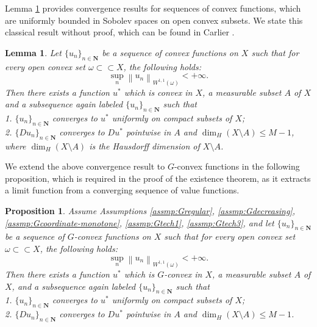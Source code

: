 \documentclass[a4paper, 11pt]{amsart}
\numberwithin{equation}{section}
\theoremstyle{plain}
\newtheorem{lemma}[theorem]{Lemma}
\newtheorem{proposition}[theorem]{Proposition}
\theoremstyle{definition}
\theoremstyle{remark}
\newcommand{\N}{\mathbf{N}}
\newcommand{\norm}[1]{\left\lVert#1\right\rVert}
\begin{document}
Lemma \ref{lemma1} provides convergence results for sequences of convex functions, which are uniformly bounded in Sobolev spaces on open convex subsets. We state this classical result without proof, which can be found in Carlier \cite{Carlier01}.\medskip


\begin{lemma}\label{lemma1}
	Let $\{u_n\}_{n\in \N}$ be a sequence of convex functions on $X$ such that for every open convex set $\omega \subset \subset X$, the following holds:
	\begin{equation*}
	\sup\limits_{n} \norm{u_n}_{W^{1,1}(\omega)} < +\infty.
	\end{equation*}
	Then there exists a function $u^*$ %
	which is convex in $X$, a measurable subset $A$ of $X$ and a subsequence again labeled $\{u_n\}_{n\in \N}$ such that\\
	1. $\{u_n\}_{n\in \N}$ converges to $u^*$ uniformly on compact subsets of $X$;\\
	2. $\{D u_n\}_{n\in \N}$ converges to $D u^*$ pointwise in $A$ and $\dim_{H}(X\setminus A)\le M-1$, where $\dim_{H}(X\setminus A)$ is the Hausdorff dimension of $X\setminus A$.
\end{lemma}

{We extend the above convergence result to $G$-convex functions in the following proposition, which is required in the proof of the existence theorem, as it extracts a limit function from a converging sequence of value functions.}

\begin{proposition}\label{proposition:convergence}
	Assume Assumptions \ref{assmp:Gregular}, \ref{assmp:Gdecreasing}, \ref{assmp:Gcoordinate-monotone}, \ref{assmp:Gtech1}, \ref{assmp:Gtech3}, and let $\{u_n\}_{n\in \N}$ be a sequence of $G$-convex functions on $X$ such that for every open convex set $\omega \subset \subset X$, the following holds:
	\begin{equation*}
	\sup\limits_{n} \norm{u_n}_{W^{1,1}(\omega )} < +\infty.
	\end{equation*}
	Then there exists a function $u^*$ which is  $G$-convex in $X$, a measurable subset $A$ of $X$, and a subsequence again labeled $\{u_n\}_{n\in \N}$ such that\\
	1. $\{u_n\}_{n\in \N}$ converges to $u^*$ uniformly on compact subsets of $X$;\\
	2. $\{D u_n\}_{n\in \N}$ converges to $D u^*$ pointwise in $A$ and $\dim_{H}(X\setminus A)\le M-1$.
\end{proposition}
\end{document}
